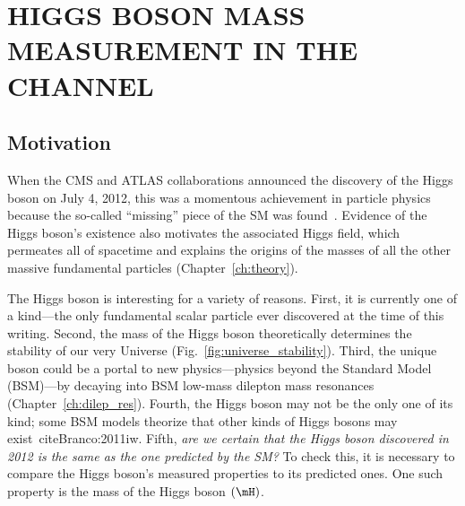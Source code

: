 \chapter{HIGGS BOSON MASS MEASUREMENT IN THE \texorpdfstring{\hzzfourl}{H to ZZ to 4l} CHANNEL}
\label{ch:higgs_mass}
\section{Motivation}
\label{sec:higgs_motivation}
When the CMS and ATLAS collaborations announced the discovery of the Higgs boson on July 4, 2012,
this was a momentous achievement in particle physics because the so-called ``missing'' piece of the SM was found~\cite{chatrchyan_observation_2012, ATLAS:2012yve, chatrchyan_observation_2013}.
Evidence of the Higgs boson's existence also motivates the associated Higgs field, which permeates all of spacetime and explains the origins of the masses of all the other massive fundamental particles (Chapter~\ref{ch:theory}).

The Higgs boson is interesting for a variety of reasons.
First, it is currently one of a kind---the only fundamental scalar particle ever discovered at the time of this writing.
Second, the mass of the Higgs boson theoretically determines the stability of our very Universe (Fig.~\ref{fig:universe_stability}).
Third, the unique boson could be a portal to new physics---\ie physics beyond the Standard Model (BSM)---\eg by decaying into BSM low-mass dilepton mass resonances (Chapter~\ref{ch:dilep_res}).
Fourth, the Higgs boson may not be the only one of its kind; some BSM models theorize that other kinds of Higgs bosons may exist~cite{Branco:2011iw}.
Fifth, \emph{are we certain that the Higgs boson discovered in 2012 is the same as the one predicted by the SM?}
To check this, it is necessary to compare the Higgs boson's measured properties to its predicted ones.
One such property is the mass of the Higgs boson $\left( \mH \right)$.

